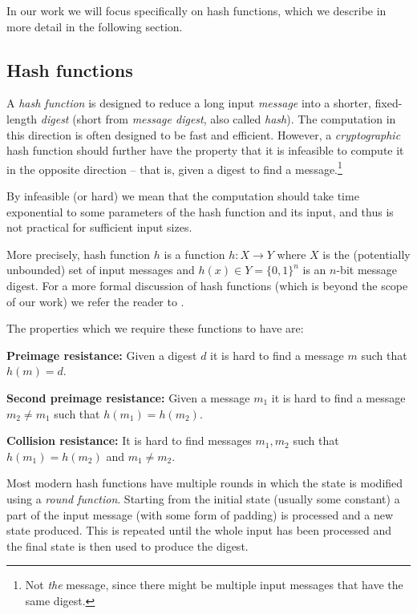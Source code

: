 In our work we will focus specifically on hash functions, which we describe in more detail in the following section.

\subsection{Hash functions}
\label{sec:hash-functions}
A \emph{hash function} is designed to reduce a long input \emph{message} into a shorter, fixed-length \emph{digest} (short from \emph{message digest}, also called \emph{hash}).
The computation in this direction is often designed to be fast and efficient.
However, a \emph{cryptographic} hash function should further have the property that it is infeasible to compute it in the opposite direction -- that is, given a digest to find a message.\footnote{Not \emph{the} message, since there might be multiple input messages that have the same digest.}

By infeasible (or hard) we mean that the computation should take time exponential to some parameters of the hash function and its input, and thus is not practical for sufficient input sizes.

More precisely, hash function $h$ is a function $h: X \to Y$ where $X$ is the (potentially unbounded) set of input messages and $h(x) \in Y = \{0,1\}^n$ is an $n$-bit message digest.
For a more formal discussion of hash functions (which is beyond the scope of our work) we refer the reader to \cite{rogaway2004cryptographic}.

The properties which we require these functions to have are:

\textbf{Preimage resistance:} Given a digest $d$ it is hard to find a message $m$ such that $h(m) = d$.

\textbf{Second preimage resistance:} Given a message $m_1$ it is hard to find a message $m_2 \neq m_1$ such that $h(m_1) = h(m_2)$.

\textbf{Collision resistance:} It is hard to find messages $m_1,m_2$ such that $h(m_1) = h(m_2)$ and $m_1 \neq m_2$.


Most modern hash functions have multiple rounds in which the state is modified using a \emph{round function}.
Starting from the initial state (usually some constant) a part of the input message (with some form of padding) is processed and a new state produced.
This is repeated until the whole input has been processed and the final state is then used to produce the digest.

